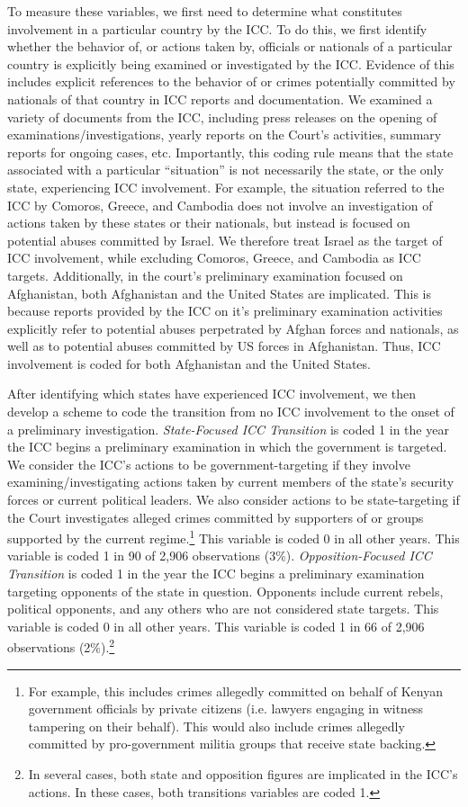 To measure these variables, we first need to determine what constitutes involvement in a particular country by the ICC. To do this, we first identify whether the behavior of, or actions taken by, officials or nationals of a particular country is explicitly being examined or investigated by the ICC. Evidence of this includes explicit references to the behavior of or crimes potentially committed by nationals of that country in ICC reports and documentation. We examined a variety of documents from the ICC, including press releases on the opening of examinations/investigations, yearly reports on the Court's activities, summary reports for ongoing cases, etc. Importantly, this coding rule means that the state associated with a particular ``situation'' is not necessarily the state, or the only state, experiencing ICC involvement. For example, the situation referred to the ICC by Comoros, Greece, and Cambodia does not involve an investigation of actions taken by these states or their nationals, but instead is focused on potential abuses committed by Israel. We therefore treat Israel as the target of ICC involvement, while excluding Comoros, Greece, and Cambodia as ICC targets. Additionally, in the court's preliminary examination focused on Afghanistan, both Afghanistan and the United States are implicated. This is because reports provided by the ICC on it's preliminary examination activities explicitly refer to potential abuses perpetrated by Afghan forces and nationals, as well as to potential abuses committed by US forces in Afghanistan. Thus, ICC involvement is coded for both Afghanistan and the United States.

After identifying which states have experienced ICC involvement, we then develop a scheme to code the transition from no ICC involvement to the onset of a preliminary investigation. \emph{State-Focused ICC Transition} is coded 1 in the year the ICC begins a preliminary examination in which the government is targeted. We consider the ICC's actions to be government-targeting if they involve examining/investigating actions taken by current members of the state's security forces or current political leaders. We also consider actions to be state-targeting if the Court investigates alleged crimes committed by supporters of or groups supported by the current regime.\footnote{For example, this includes crimes allegedly committed on behalf of Kenyan government officials by private citizens (i.e. lawyers engaging in witness tampering on their behalf). This would also include crimes allegedly committed by pro-government militia groups that receive state backing.} This variable is coded 0 in all other years. This variable is coded 1 in 90 of 2,906 observations (3\%). \emph{Opposition-Focused ICC Transition} is coded 1 in the year the ICC begins a preliminary examination targeting opponents of the state in question. Opponents include current rebels, political opponents, and any others who are not considered state targets. This variable is coded 0 in all other years. This variable is coded 1 in 66 of 2,906 observations (2\%).\footnote{In several cases, both state and opposition figures are implicated in the ICC's actions. In these cases, both transitions variables are coded 1.}


